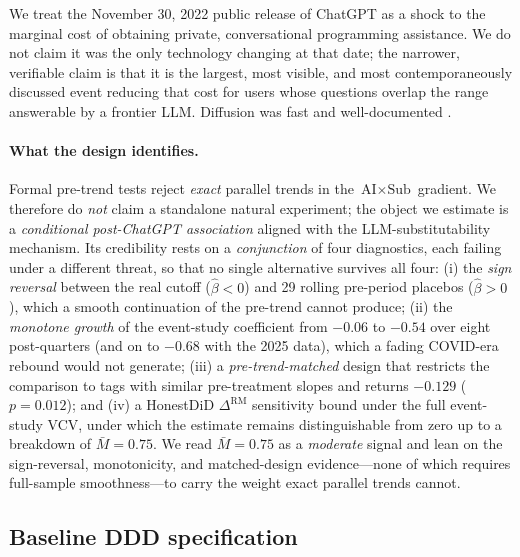 \label{sec:identification_body}

We treat the November 30, 2022 public release of ChatGPT as a
shock to the marginal cost of obtaining private, conversational
programming assistance. We do not claim it was the only
technology changing at that date; the narrower, verifiable claim
is that it is the largest, most visible, and most
contemporaneously discussed event reducing that cost for users
whose questions overlap the range answerable by a frontier LLM.
Diffusion was fast and well-documented
\citep{eloundou2024gpts,brynjolfsson2025generative,peng2023impact,cui2024effects}.

\paragraph{What the design identifies.}
Formal pre-trend tests reject \emph{exact} parallel trends in
the $\text{AI}\times\text{Sub}$ gradient. We therefore do
\emph{not} claim a standalone natural experiment; the object we
estimate is a \emph{conditional post-ChatGPT association}
aligned with the LLM-substitutability mechanism. Its
credibility rests on a \emph{conjunction} of four diagnostics,
each failing under a different threat, so that no single
alternative survives all four: (i) the \emph{sign reversal}
between the real cutoff ($\hat\beta<0$) and 29 rolling
pre-period placebos ($\hat\beta>0$), which a smooth
continuation of the pre-trend cannot produce; (ii) the
\emph{monotone growth} of the event-study coefficient from
$-0.06$ to $-0.54$ over eight post-quarters (and on to $-0.68$
with the 2025 data), which a fading COVID-era rebound would
not generate; (iii) a \emph{pre-trend-matched} design that
restricts the comparison to tags with similar pre-treatment
slopes and returns $-0.129$ ($p=0.012$); and (iv) a HonestDiD
$\Delta^{\text{RM}}$ sensitivity bound under the full
event-study VCV, under which the estimate remains
distinguishable from zero up to a breakdown of $\bar M=0.75$.
We read $\bar M=0.75$ as a \emph{moderate} signal and lean on
the sign-reversal, monotonicity, and matched-design
evidence---none of which requires full-sample smoothness---to
carry the weight exact parallel trends cannot.

\subsection{Baseline DDD specification}\label{ssec:id_ddd_main}

